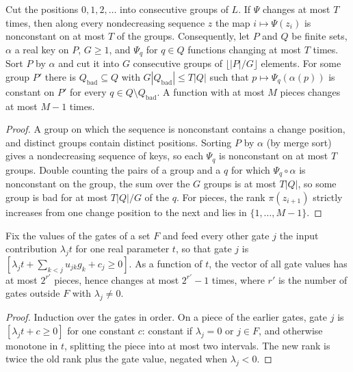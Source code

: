 \begin{lemma}
  \label{lem:lowerbounds-threshold-sorted-groups}
  \leanok
  Cut the positions $0,1,2,\dots$ into consecutive groups of $L$. If $\Psi$ changes
  at most $T$ times, then along every nondecreasing sequence $z$ the map
  $i\mapsto\Psi(z_i)$ is nonconstant on at most $T$ of the groups. Consequently,
  let $P$ and $Q$ be finite sets, $\alpha$ a real key on $P$, $G\ge1$, and $\Psi_q$
  for $q\in Q$ functions changing at most $T$ times. Sort $P$ by $\alpha$ and cut it
  into $G$ consecutive groups of $\lfloor|P|/G\rfloor$ elements. For some group
  $P'$ there is $Q_{\mathrm{bad}}\subseteq Q$ with $G|Q_{\mathrm{bad}}|\le T|Q|$
  such that $p\mapsto\Psi_q(\alpha(p))$ is constant on $P'$ for every
  $q\in Q\setminus Q_{\mathrm{bad}}$. A function with at most $M$ pieces changes at
  most $M-1$ times.
\end{lemma}
\begin{proof}
  \leanok
  A group on which the sequence is nonconstant contains a change position, and
  distinct groups contain distinct positions. Sorting $P$ by $\alpha$ (by merge
  sort) gives a nondecreasing sequence of keys, so each $\Psi_q$ is nonconstant on
  at most $T$ groups. Double counting the pairs of a group and a $q$ for which
  $\Psi_q\circ\alpha$ is nonconstant on the group, the sum over the $G$ groups is at
  most $T|Q|$, so some group is bad for at most $T|Q|/G$ of the $q$. For pieces,
  the rank $\pi(z_{i+1})$ strictly increases from one change position to the next
  and lies in $\{1,\dots,M-1\}$.
\end{proof}

\begin{lemma}
  \label{lem:lowerbounds-threshold-run-pieces}
  \leanok
  Fix the values of the gates of a set $F$ and feed every other gate $j$ the input
  contribution $\lambda_j t$ for one real parameter $t$, so that gate $j$ is
  $[\lambda_j t+\sum_{k<j}u_{jk}g_k+c_j\ge0]$. As a function of $t$, the vector of
  all gate values has at most $2^{r'}$ pieces, hence changes at most $2^{r'}-1$
  times, where $r'$ is the number of gates outside $F$ with $\lambda_j\ne0$.
\end{lemma}
\begin{proof}
  \leanok
  Induction over the gates in order. On a piece of the earlier gates, gate $j$ is
  $[\lambda_j t+c\ge0]$ for one constant $c$: constant if $\lambda_j=0$ or
  $j\in F$, and otherwise monotone in $t$, splitting the piece into at most two
  intervals. The new rank is twice the old rank plus the gate value, negated when
  $\lambda_j<0$.
\end{proof}

